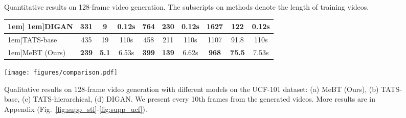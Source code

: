 \documentclass[10pt,twocolumn,letterpaper]{article}
\begin{document}
\iffalse
\begin{tabular}{lcccccc}
        \toprule
        \-1em]\Xhline{2\arrayrulewidth}
        \-1em]DIGAN & 331\tiny{} & 9\tiny{} & 764\tiny{} & 230\tiny{} & 1627\tiny{} & 122\tiny{}\\
\-1em]CCVS & N/A & N/A & N/A & N/A & 1411\tiny{} & 121\tiny{} \\
        \-1em]TATS-hierarchical & 455\tiny{} & 21\tiny{} & 803\tiny{} & 371\tiny{} & 1138\tiny{} & 83.4\tiny{11.6}\\
        \bottomrule
        \end{tabular}
\fi
\begin{figure*}[!ht]
    \begin{minipage}{\textwidth}
    \captionsetup{type=table}
    \centering
    \caption{Quantitative results on 128-frame video generation. The subscripts on methods denote the length of training videos.}
    \vspace{-0.2cm}
\begin{adjustbox}{width=1.0\textwidth}
    \label{tab:longterm}
    \centering
        \begin{tabular}{lccccccccc}
        \toprule
        \-1em]\Xhline{2\arrayrulewidth}
        \-1em]DIGAN & 331\tiny{} & 9\tiny{} & {0.12s} & 764\tiny{} & 230\tiny{} & {0.12s} & 1627\tiny{} & 122\tiny{} & {0.12s}\\\hline
        \-1em]TATS-base & 435\tiny{} & 19\tiny{} & 110s & 458\tiny{} & 211\tiny{} & 110s & 1107\tiny{} & 91.8\tiny{} & 110s\\
        \-1em]MeBT (Ours) & \bf{239\tiny{}} & \bf{5.1\tiny{}} & 6.53s & \bf{399\tiny{}} & \bf{139\tiny{}} & 6.62s & \bf{968\tiny{}} & \bf{75.5\tiny{}} & 7.53s\\
        \bottomrule
        \end{tabular}
    \end{adjustbox}
    \end{minipage}
    \vspace{0.1cm}
    
    \begin{minipage}{\textwidth}
    \centering
    \texttt{[image: figures/comparison.pdf]} \vspace{-0.5cm}
\captionsetup{type=figure}
    \vspace{-0.2cm}
    \caption{Qualitative results on 128-frame video generation with different models on the UCF-101 dataset: (a) MeBT (Ours), (b) TATS-base, (c) TATS-hierarchical, (d) DIGAN. 
We present every 10th frames from the generated videos.
More results are in Appendix (Fig.~\ref{fig:supp_stl}-\ref{fig:supp_ucf}).
    }
    \label{fig:longterm_qualitative}
    \end{minipage}
    \vspace{-0.6cm}
\end{figure*}
\vspace{-0.4cm}
\end{document}
